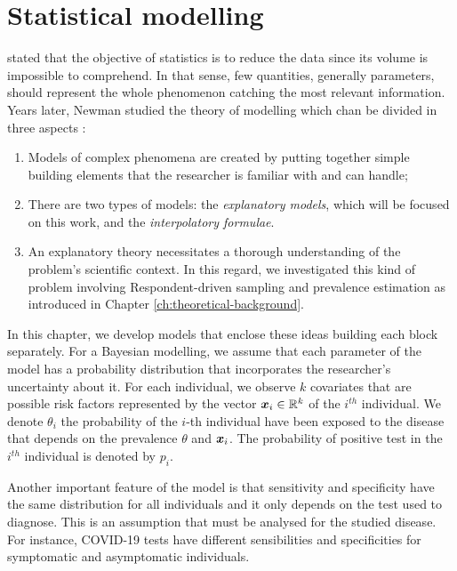 \chapter{Statistical modelling}

\textcite[p. 311]{fisher1922mathematical} stated that the objective of
statistics is to reduce the data since its volume is impossible 
to comprehend. In that sense, few quantities, generally parameters, 
should represent the whole phenomenon catching the most relevant information. 
Years later, Newman studied the theory of modelling which chan be divided 
in three aspects \cite[p. 161]{lehmann2012model}: 

\begin{enumerate}
  \item Models of complex phenomena are created by putting together 
  simple building elements that the researcher is familiar with and can 
  handle; 
  \item There are two types of models: the \textit{explanatory models}, 
  which will be focused on this work, and the \textit{interpolatory formulae}. 
  \item An explanatory theory necessitates a thorough understanding 
  of the problem's scientific context. In this regard, we investigated 
  this kind of problem involving Respondent-driven sampling and prevalence
  estimation as introduced in Chapter \ref{ch:theoretical-background}. 
\end{enumerate}

In this chapter, we develop models that enclose these ideas building each 
block separately. For a Bayesian modelling, we assume that each parameter
of the model has a probability distribution that incorporates the 
researcher's uncertainty about it. For each individual, we observe $k$ 
covariates that are possible risk factors represented by the vector 
$\boldsymbol{x}_i \in \mathbb{R}^{k}$ of the $i^{th}$ individual. We denote $\theta_i$ the 
probability of the $i$-th individual have been exposed to the disease
that depends on the prevalence $\theta$ and $\boldsymbol{x}_i$.  The probability of positive test 
in the $i^{th}$ individual is denoted by $p_i$.  

Another important feature of the model is that sensitivity and 
specificity have the same distribution for all individuals and 
it only depends on the test used to diagnose. This is an assumption 
that must be analysed for the studied disease. For instance, COVID-19 
tests have different sensibilities and specificities for symptomatic and 
asymptomatic individuals.  

